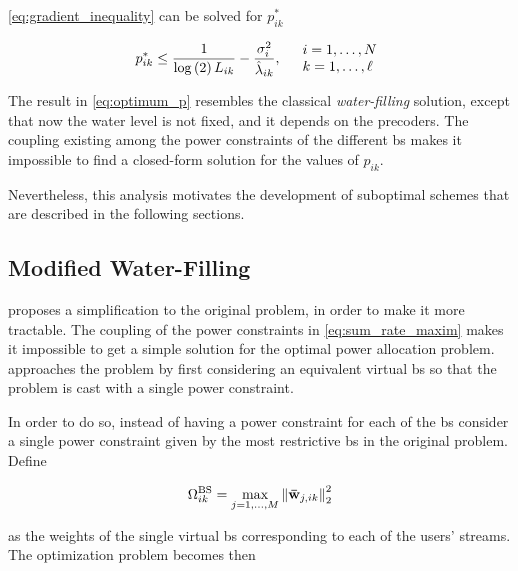 \noindent
\eqref{eq:gradient_inequality} can be solved for $p_{ik}^\ast$

\begin{equation} \label{eq:optimum_p}
    p_{ik}^\ast \leq \frac{1}{\log\left(2\right)L_{ik}} - \frac{\sigma_i^2}
    {\hat{\lambda}_{ik}}, \quad
	\begin{array}{l}
        i = 1, \ldots, N\\
        k = 1, \ldots, \ell
	\end{array}\\
\end{equation}

The result in \eqref{eq:optimum_p} resembles the classical \emph{water-filling}
solution, except that now the water level is not fixed, and it depends on the
precoders. The coupling existing among the power constraints of the different
\gls{bs} makes it impossible to find a closed-form solution for the values of
$p_{ik}$.

Nevertheless, this analysis motivates the development of suboptimal schemes that are described in the following sections.

\subsection{Modified Water-Filling}\label{ssec:modified_wf}

\cite{armada11b} proposes a simplification to the original problem, in order to
make it more tractable. The coupling of the power constraints in
\eqref{eq:sum_rate_maxim} makes it impossible to get a simple solution for the
optimal power allocation problem. \cite{armada11b} approaches the problem by
first considering an equivalent virtual \gls{bs} so that the problem is cast
with a single power constraint.

In order to do so, instead of having a power constraint for each of the \gls{bs}
consider a single power constraint given by the most restrictive \gls{bs} in the
original problem. Define

\begin{equation} \label{eq:equiv_bs}
    \Omega_{ik}^{\text{BS}} = \max\limits_{j=1, \ldots,M} \left\|\mathbf{\bar{w}}_{j,ik} \right\|_2^2
\end{equation}

\noindent
as the weights of the single virtual \gls{bs} corresponding to each of the
users' streams. The optimization problem becomes then

